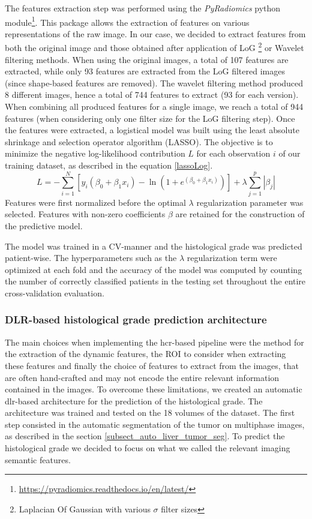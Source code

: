 The features extraction step was performed using the \textit{PyRadiomics} python module\footnote{\url{https://pyradiomics.readthedocs.io/en/latest/}}. This package allows the extraction of features on various representations of the raw image. In our case, we decided to extract features from both the original image and those obtained after application of LoG \footnote{Laplacian Of Gaussian with various $\sigma$ filter sizes} or Wavelet filtering methods. When using the original images, a total of 107 features are extracted, while only 93 features are extracted from the LoG filtered images (since shape-based features are removed). The wavelet filtering method produced 8 different images, hence a total of 744 features to extract (93 for each version). When combining all produced features for a single image, we reach a total of 944 features (when considering only one filter size for the LoG filtering step).
Once the features were extracted, a logistical model was built using the least absolute shrinkage and selection operator algorithm (LASSO). The objective is to minimize the negative log-likelihood contribution $L$ for each observation $ i $ of our training dataset, as described in the equation \ref{lassoLog}.
\begin{equation} \label{lassoLog}
L = -\sum_{i=1}^{N} \left[ y_{i} \left( {\beta}_{0} + {\beta}_{1} x_{i} \right) -\ln \left( 1+e^{({\beta}_{0} + {\beta}_{1} x_{i})} \right) \right] + \lambda \sum_{j=1}^{p} \left| {\beta}_{j} \right|
\end{equation}
Features were first normalized before the optimal $ \lambda  $ regularization parameter was selected. Features with non-zero coefficients $ \beta $ are retained for the construction of the predictive model.

The model was trained in a CV-manner and the histological grade was predicted patient-wise. The hyperparameters such as the $ \lambda $ regularization term were optimized at each fold and the accuracy of the model was computed by counting the number of correctly classified patients in the testing set throughout the entire cross-validation evaluation.

\subsubsection{DLR-based histological grade prediction architecture}\label{dlr-based_method}

The main choices when implementing the \ac{hcr}-based pipeline were the method for the extraction of the dynamic features, the ROI to consider when extracting these features and finally the choice of features to extract from the images, that are often hand-crafted and may not encode the entire relevant information contained in the images.
To overcome these limitations, we created an automatic \ac{dlr}-based architecture for the prediction of the histological grade. The architecture was trained and tested on the 18 volumes of the \textbf{} dataset.
The first step consisted in the automatic segmentation of the tumor on multiphase images, as described in the section \ref{subsect_auto_liver_tumor_seg}.
To predict the histological grade we decided to focus on what we called the
relevant imaging semantic features.

